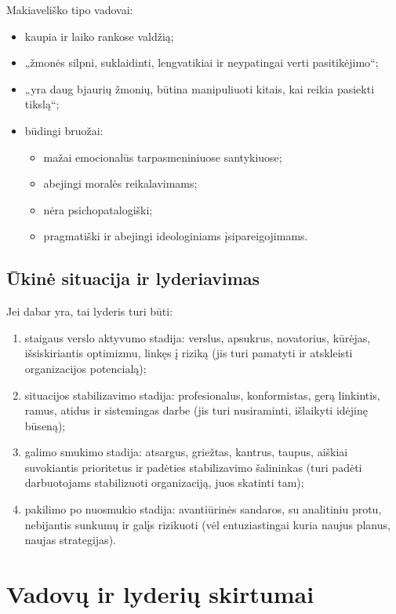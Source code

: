Makiaveliško tipo vadovai:
\begin{itemize}
  \item kaupia ir laiko rankose valdžią;
  \item „žmonės silpni, suklaidinti, lengvatikiai ir neypatingai verti
    pasitikėjimo“;
  \item „yra daug bjaurių žmonių, būtina manipuliuoti kitais, kai reikia
    pasiekti tikslą“;
  \item būdingi bruožai:
    \begin{itemize}
      \item mažai emocionalūs tarpasmeniniuose santykiuose;
      \item abejingi moralės reikalavimams;
      \item nėra psichopatalogiški;
      \item pragmatiški ir abejingi ideologiniams įsipareigojimams.
    \end{itemize}
\end{itemize}

\subsection{Ūkinė situacija ir lyderiavimas}

Jei dabar yra, tai lyderis turi būti:
\begin{enumerate}
  \item staigaus verslo aktyvumo stadija: verslus, apsukrus, novatorius,
    kūrėjas, išsiskiriantis optimizmu, linkęs į riziką (jis turi pamatyti
    ir atskleisti organizacijos potencialą);
  \item situacijos stabilizavimo stadija: profesionalus, konformistas,
    gerą linkintis, ramus, atidus ir sistemingas darbe (jis turi 
    nusiraminti, išlaikyti idėjinę būseną);
  \item galimo smukimo stadija: atsargus, griežtas, kantrus, taupus,
    aiškiai suvokiantis prioritetus ir padėties stabilizavimo šalininkas
    (turi padėti darbuotojams stabilizuoti organizaciją, juos skatinti
    tam);
  \item pakilimo po nuosmukio stadija: avantiūrinės sandaros, su
    analitiniu protu, nebijantis sunkumų ir galįs rizikuoti
    (vėl entuziastingai kuria naujus planus, naujas strategijas).
\end{enumerate}

\section{Vadovų ir lyderių skirtumai}

